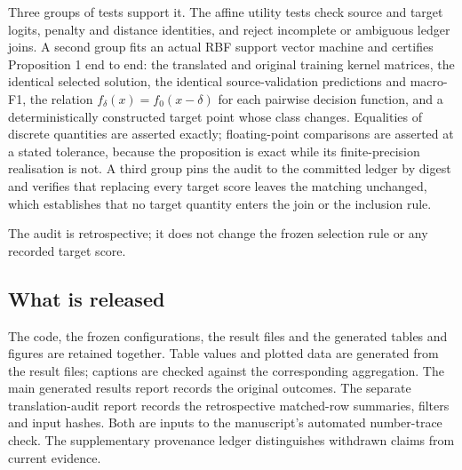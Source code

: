 Three groups of tests support it. The affine utility tests check source and
target logits, penalty and distance identities, and reject incomplete or
ambiguous ledger joins. A second group fits an actual RBF support vector
machine and certifies Proposition 1 end to end: the translated and original
training kernel matrices, the identical selected solution, the identical
source-validation predictions and macro-F1, the relation
$f_\delta(x)=f_0(x-\delta)$ for each pairwise decision function, and a
deterministically constructed target point whose class changes. Equalities of
discrete quantities are asserted exactly; floating-point comparisons are
asserted at a stated tolerance, because the proposition is exact while its
finite-precision realisation is not. A third group pins the audit to the
committed ledger by digest and verifies that replacing every target score
leaves the matching unchanged, which establishes that no target quantity
enters the join or the inclusion rule.

The audit is retrospective; it does not change the frozen selection rule or any
recorded target score.

\subsection{What is released}
\label{sec:repro-release}

The code, the frozen configurations, the result files and the generated tables
and figures are retained together. Table values and plotted data are generated
from the result files; captions are checked against the corresponding
aggregation. The main generated results report records the original outcomes.
The separate translation-audit report records the retrospective matched-row
summaries, filters and input hashes. Both are inputs to the manuscript's
automated number-trace check. The supplementary provenance ledger distinguishes
withdrawn claims from current evidence.
